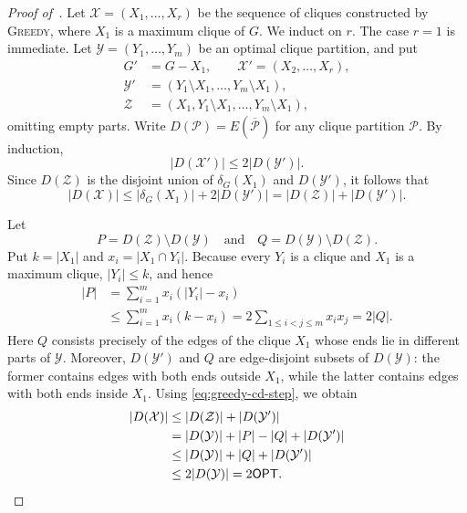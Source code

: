 \documentclass[a4paper,fleqn]{cas-sc}
\theoremstyle{remark}
\theoremstyle{plain}
\newcommand{\greedy}{{\textsc{Greedy}}}
\newcommand{\opt}{{\mathsf{OPT}}}
\begin{document}
\begin{proof}[Proof of~]
Let $\mathcal{X}=(X_1,\ldots,X_r)$ be the sequence of cliques
constructed by \greedy{}, where $X_1$ is a maximum clique of $G$.
We induct on $r$. The case $r=1$ is immediate. Let
$\mathcal{Y}=(Y_1,\ldots,Y_m)$ be an optimal clique partition, and
put
\[
\begin{split}
G'&=G-X_1,\qquad
\mathcal{X}'=(X_2,\ldots,X_r),\\
\mathcal{Y}'&=(Y_1\setminus X_1,\ldots,Y_m\setminus X_1),\\
\mathcal{Z}&=(X_1,Y_1\setminus X_1,\ldots,Y_m\setminus X_1),
\end{split}
\]
omitting empty parts. Write $D(\mathcal{P})=E(\overline{\mathcal{P}})$
for any clique partition $\mathcal{P}$. By induction,
\[
   |D(\mathcal{X}')|\leq 2|D(\mathcal{Y}')|.
\]
Since $D(\mathcal{Z})$ is the disjoint union of
$\delta_G(X_1)$ and $D(\mathcal{Y}')$, it follows that
\begin{equation} \label{eq:greedy-cd-step}
|D(\mathcal{X})|
\leq |\delta_G(X_1)|+2|D(\mathcal{Y}')|
=|D(\mathcal{Z})|+|D(\mathcal{Y}')|.
\end{equation}

Let
\[
   P=D(\mathcal{Z})\setminus D(\mathcal{Y})
   \quad\text{and}\quad
   Q=D(\mathcal{Y})\setminus D(\mathcal{Z}).
\]
Put $k=|X_1|$ and $x_i=|X_1\cap Y_i|$. Because every $Y_i$ is a
clique and $X_1$ is a maximum clique, $|Y_i|\leq k$, and hence
\begin{align*}
|P|
 &=\sum_{i=1}^m x_i(|Y_i|-x_i)\\
 &\leq\sum_{i=1}^m x_i(k-x_i)
 =2\sum_{1\leq i<j\leq m}x_ix_j
 =2|Q|.
\end{align*}
Here $Q$ consists precisely of the edges of the clique $X_1$ whose
ends lie in different parts of $\mathcal{Y}$. Moreover,
$D(\mathcal{Y}')$ and $Q$ are edge-disjoint subsets of
$D(\mathcal{Y})$: the former contains edges with both ends outside
$X_1$, while the latter contains edges with both ends inside $X_1$.
Using \eqref{eq:greedy-cd-step}, we obtain
\begin{align*}
|D(\mathcal{X})|
&\leq |D(\mathcal{Z})|+|D(\mathcal{Y}')|\\
&=|D(\mathcal{Y})|+|P|-|Q|+|D(\mathcal{Y}')|\\
&\leq |D(\mathcal{Y})|+|Q|+|D(\mathcal{Y}')|\\
&\leq 2|D(\mathcal{Y})|=2\opt. \qedhere
\end{align*}
\end{proof}
\end{document}
